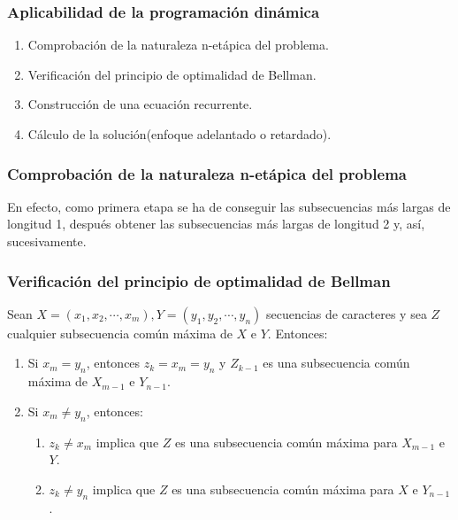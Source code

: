 \documentclass[13pt]{beamer}
\begin{document}
    \begin{frame}
		\frametitle{Aplicabilidad de la programación dinámica}
        \begin{enumerate}
            \item Comprobación de la naturaleza n-etápica del problema. 
            \item Verificación del principio de optimalidad de Bellman. 
            \item Construcción de una ecuación recurrente. 
            \item Cálculo de la solución(enfoque adelantado o retardado). 
        \end{enumerate}
	\end{frame}

    \begin{frame}
		\frametitle{Comprobación de la naturaleza n-etápica del problema}
        En efecto, como primera etapa se ha de conseguir las subsecuencias más largas de longitud 1, 
        después obtener las subsecuencias más largas de longitud 2 y, así, sucesivamente. 
	\end{frame}

    \begin{frame}
		\frametitle{Verificación del principio de optimalidad de Bellman}
        \begin{theorem}
            Sean $X=(x_1,x_2,\cdots, x_m),Y=(y_1,y_2, \cdots, y_n)$ secuencias de caracteres 
            y sea $Z$ cualquier subsecuencia común máxima 
            de $X$ e $Y$. Entonces:
            \begin{enumerate}
              \item Si $x_m = y_n$, entonces $z_k = x_m = y_n$ y $Z_{k-1}$ es una subsecuencia
              común máxima de $X_{m-1}$ e $Y_{n-1}$. 
              \item Si $x_m \neq y_n$, entonces:
              \begin{enumerate}
                \item $z_k \neq x_m$ implica que $Z$ es una subsecuencia común máxima para $X_{m-1}$ e $Y$. 
                \item $z_k \neq y_n$ implica que $Z$ es una subsecuencia común máxima para $X$ e $Y_{n-1}$. 
              \end{enumerate}
            \end{enumerate}
        \end{theorem}
	\end{frame}
\end{document}
